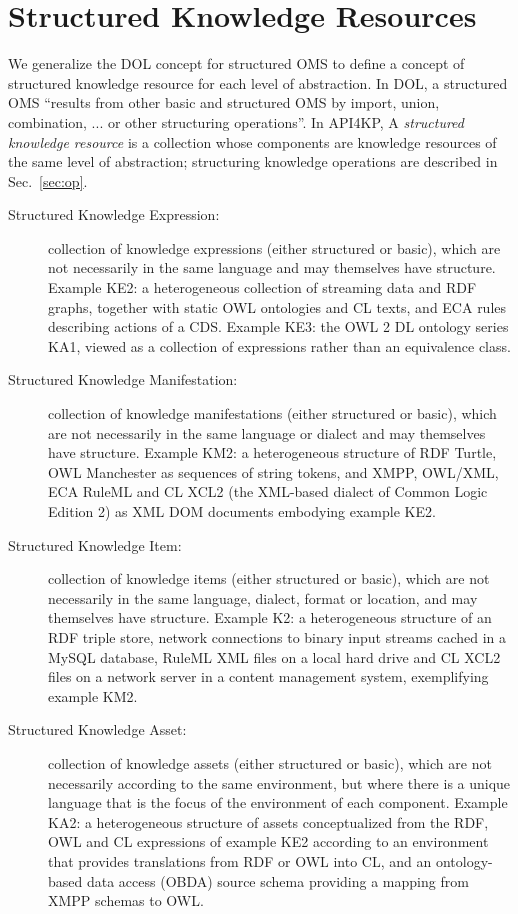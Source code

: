 \documentclass[runningheads]{llncs}
\begin{document}
\section{Structured Knowledge Resources}
\label{sec:structure}
We generalize the DOL concept for structured OMS to define a concept of structured knowledge resource for each level of abstraction. In DOL, a structured OMS ``results from other basic and structured OMS by import, union, combination, ... or other structuring operations''.
In API4KP, A \emph{structured knowledge resource} is a collection whose components are knowledge resources of the same level of abstraction; structuring knowledge operations are described in Sec.~\ref{sec:op}.
\begin{description}
\item[Structured Knowledge Expression:] collection of knowledge expressions (either structured or basic), which are not necessarily in the same language and may themselves have structure. Example KE2: a heterogeneous collection of streaming data and RDF graphs, together with static OWL ontologies and CL texts, and ECA rules describing actions of a CDS. Example KE3: the OWL 2 DL ontology series KA1, viewed as a collection of expressions rather than an equivalence class.
\item[Structured Knowledge Manifestation:] collection of knowledge manifestations (either structured or basic), which are not necessarily in the same language or dialect and may themselves have structure. Example KM2: a heterogeneous structure of RDF Turtle, OWL Manchester as sequences of string tokens, and XMPP, OWL/XML, ECA RuleML and CL XCL2 (the XML-based dialect of Common Logic Edition 2) as XML DOM documents embodying example KE2.
\item[Structured Knowledge Item:] collection of knowledge items  (either structured or basic), which are not necessarily in the same language, dialect, format or location, and may themselves have structure. Example K2:  a heterogeneous structure of an RDF triple store, network connections to binary input streams cached in a MySQL database, RuleML XML files on a local hard drive and CL XCL2 files on a network server in a content management system, exemplifying example KM2.
\item[Structured Knowledge Asset:] collection of knowledge assets  (either structured or basic), which are not necessarily according to the same environment, but where there is a unique language that is the focus of the environment of each component. Example KA2: a heterogeneous structure of assets conceptualized from the RDF, OWL and CL expressions of example KE2 according to an environment that provides translations from RDF or OWL into CL, and an ontology-based data access (OBDA) source schema providing a mapping from XMPP schemas to OWL.
\end{description}
\end{document}
